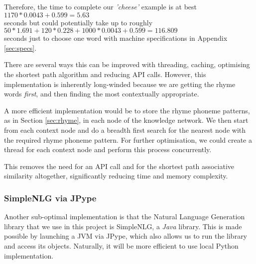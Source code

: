 Therefore, the time to complete our \textit{'cheese'} example is at best\\ $1170*0.0043 + 0.599  = 5.63$\\ seconds but could potentially take up to roughly\\ $50*1.691 + 120*0.228 + 1000*0.0043 + 0.599  = 116.809$\\ seconds just to choose one word with machine specifications in Appendix \ref{sec:specs}.

There are several ways this can be improved with threading, caching, optimising the shortest path algorithm and reducing API calls. However, this implementation is inherently long-winded because we are getting the rhyme words \textit{first}, and then finding the most contextually appropriate. 

A more efficient implementation would be to store the rhyme phoneme patterns, as in Section \ref{sec:rhyme}, in each node of the knowledge network. We then start from each context node and do a breadth first search for the nearest node with the required rhyme phoneme pattern. For further optimisation, we could create a thread for each context node and perform this process concurrently.

This removes the need for an API call and for the shortest path associative similarity altogether, significantly reducing time and memory complexity.

\subsubsection{SimpleNLG via JPype}

Another sub-optimal implementation is that the Natural Language Generation library that we use in this project is SimpleNLG, a \textit{Java} library. This is made possible by launching a JVM via JPype, which also allows us to run the library and access its objects. Naturally, it will be more efficient to use local Python implementation.



